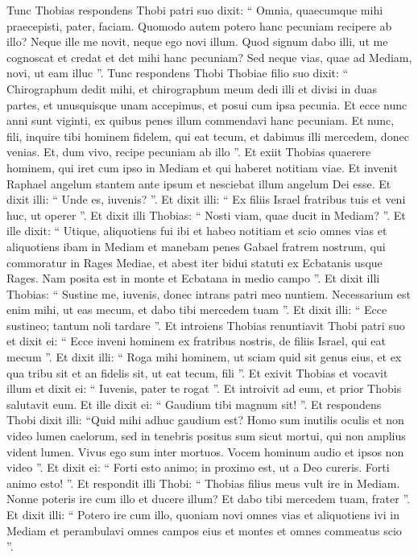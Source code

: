 \begin{biblechapter}
\begin{biblechapter}
\begin{biblechapter}
\begin{biblechapter}
\begin{biblechapter}
\verse Tunc Thobias respondens Thobi patri suo dixit: “ Omnia, quaecumque mihi praecepisti, pater, faciam. 
\verse Quomodo autem potero hanc pecuniam recipere ab illo? Neque ille me novit, neque ego novi illum. Quod signum dabo illi, ut me cognoscat et credat et det mihi hanc pecuniam? Sed neque vias, quae ad Mediam, novi, ut eam illuc ”. 
\verse Tunc respondens Thobi Thobiae filio suo dixit: “ Chirographum dedit mihi, et chirographum meum dedi illi et divisi in duas partes, et unusquisque unam accepimus, et posui cum ipsa pecunia. Et ecce nunc anni sunt viginti, ex quibus penes illum commendavi hanc pecuniam. Et nunc, fili, inquire tibi hominem fidelem, qui eat tecum, et dabimus illi mercedem, donec venias. Et, dum vivo, recipe pecuniam ab illo ”.
 \verse Et exiit Thobias quaerere hominem, qui iret cum ipso in Mediam et qui haberet notitiam viae. Et invenit Raphael angelum stantem ante ipsum et nesciebat illum angelum Dei esse. 
\verse Et dixit illi: “ Unde es, iuvenis? ”. Et dixit illi: “ Ex filiis Israel fratribus tuis et veni huc, ut operer ”. Et dixit illi Thobias: “ Nosti viam, quae ducit in Mediam? ”. 
\verse Et ille dixit: “ Utique, aliquotiens fui ibi et habeo notitiam et scio omnes vias et aliquotiens ibam in Mediam et manebam penes Gabael fratrem nostrum, qui commoratur in Rages Mediae, et abest iter bidui statuti ex Ecbatanis usque Rages. Nam posita est in monte et Ecbatana in medio campo ”. 
\verse Et dixit illi Thobias: “ Sustine me, iuvenis, donec intrans patri meo nuntiem. Necessarium est enim mihi, ut eas mecum, et dabo tibi mercedem tuam ”. 
\verse Et dixit illi: “ Ecce sustineo; tantum noli tardare ”. 
\verse Et introiens Thobias renuntiavit Thobi patri suo et dixit ei: “ Ecce inveni hominem ex fratribus nostris, de filiis Israel, qui eat mecum ”. Et dixit illi: “ Roga mihi hominem, ut sciam quid sit genus eius, et ex qua tribu sit et an fidelis sit, ut eat tecum, fili ”. 
\verse Et exivit Thobias et vocavit illum et dixit ei: “ Iuvenis, pater te rogat ”. Et introivit ad eum, et prior Thobis salutavit eum. Et ille dixit ei: “ Gaudium tibi magnum sit! ”. Et respondens Thobi dixit illi: “Quid mihi adhuc gaudium est? Homo sum inutilis oculis et non video lumen caelorum, sed in tenebris positus sum sicut mortui, qui non amplius vident lumen. Vivus ego sum inter mortuos. Vocem hominum audio et ipsos non video ”. Et dixit ei: “ Forti esto animo; in proximo est, ut a Deo cureris. Forti animo esto! ”. Et respondit illi Thobi: “ Thobias filius meus vult ire in Mediam. Nonne poteris ire cum illo et ducere illum? Et dabo tibi mercedem tuam, frater ”. Et dixit illi: “ Potero ire cum illo, quoniam novi omnes vias et aliquotiens ivi in Mediam et perambulavi omnes campos eius et montes et omnes commeatus scio ”. 

\end{biblechapter}
\end{biblechapter}
\end{biblechapter}
\end{biblechapter}
\end{biblechapter}
